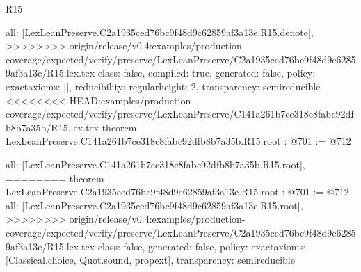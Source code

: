 \begin{lexlean}{R15}
\begin{coremodule}
{{{{{  all: [LexLeanPreserve.C2a1935ced76bc9f48d9c62859af3a13e.R15.denote],
>>>>>>>> origin/release/v0.4:examples/production-coverage/expected/verify/preserve/LexLeanPreserve/C2a1935ced76bc9f48d9c62859af3a13e/R15.lex.tex
  class: false,
  compiled: true,
  generated: false,
  policy: exact{axioms: []},
  reducibility: regular{height: 2},
  transparency: semireducible
}
<<<<<<<< HEAD:examples/production-coverage/expected/verify/preserve/LexLeanPreserve/C141a261b7ce318c8fabc92dfb8b7a35b/R15.lex.tex
theorem LexLeanPreserve.C141a261b7ce318c8fabc92dfb8b7a35b.R15.root : @701 := @712 {
  all: [LexLeanPreserve.C141a261b7ce318c8fabc92dfb8b7a35b.R15.root],
========
theorem LexLeanPreserve.C2a1935ced76bc9f48d9c62859af3a13e.R15.root : @701 := @712 {
  all: [LexLeanPreserve.C2a1935ced76bc9f48d9c62859af3a13e.R15.root],
>>>>>>>> origin/release/v0.4:examples/production-coverage/expected/verify/preserve/LexLeanPreserve/C2a1935ced76bc9f48d9c62859af3a13e/R15.lex.tex
  class: false,
  generated: false,
  policy: exact{axioms: [Classical.choice, Quot.sound, propext]},
  transparency: semireducible
}

}}}}}
\end{coremodule}
\end{lexlean}
